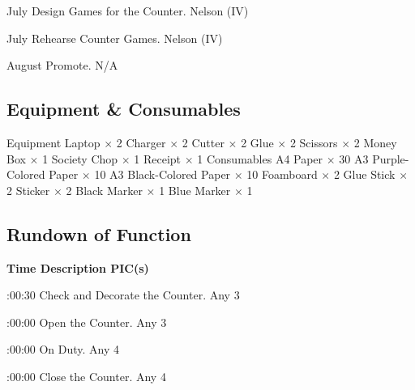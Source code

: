 \bTR{}
\eTD{} July
\eTD\bTD Design Games for the Counter.
\eTD\bTD Nelson (IV)
\eTD\eTR

\bTR{}
\eTD{} July
\eTD\bTD Rehearse Counter Games.
\eTD\bTD Nelson (IV)
\eTD\eTR

\bTR{}
\eTD{} August
\eTD\bTD Promote.
\eTD\bTD N/A
\eTD\eTR

\eTABLEbody
\eTABLE

\subsection{Equipment \& Consumables}
\starttabulate[|l|l|]
\NC{}Equipment\NC\NR
\HL
\NC Laptop                  \NC $\times$ 2  \NR
\NC Charger                 \NC $\times$ 2  \NR
\NC Cutter                  \NC $\times$ 2  \NR
\NC Glue                    \NC $\times$ 2  \NR
\NC Scissors                \NC $\times$ 2  \NR
\NC Money Box               \NC $\times$ 1  \NR
\NC Society Chop            \NC $\times$ 1  \NR
\NC Receipt                 \NC $\times$ 1  \NR
\HL
\NR
\NC{}Consumables\NC\NR
\HL
\NC A4 Paper                \NC $\times$ 30 \NR
\NC A3 Purple-Colored Paper \NC $\times$ 10 \NR
\NC A3 Black-Colored Paper  \NC $\times$ 10 \NR
\NC Foamboard               \NC $\times$ 2  \NR
\NC Glue Stick              \NC $\times$ 2  \NR
\NC Sticker                 \NC $\times$ 2  \NR
\NC Black Marker            \NC $\times$ 1  \NR
\NC Blue Marker             \NC $\times$ 1  \NR
\HL
\stoptabulate

\subsection{Rundown of Function}

\setupTABLE[c][1][width=1.25in]
\setupTABLE[c][2][width=3.5in]
\setupTABLE[c][3][width=1.25in]
\bTABLE
\bTABLEhead

\bTR\bTH    \bf{Time}
\eTH\bTH    \bf{Description}
\eTH\bTH    \bf{PIC(s)}
\eTH\eTR

\eTABLEhead
\bTABLEbody

\bTR{}:00:30
\eTD\bTD Check and Decorate the Counter.
\eTD\bTD Any 3
\eTD\eTR

\bTR{}:00:00
\eTD\bTD Open the Counter.
\eTD\bTD Any 3
\eTD\eTR

\bTR{}:00:00
\eTD\bTD On Duty.
\eTD\bTD Any 4
\eTD\eTR

\bTR{}:00:00
\eTD\bTD Close the Counter.
\eTD\bTD Any 4
\eTD\eTR

\eTABLEbody
\eTABLE

\stopsection
\pagebreak
